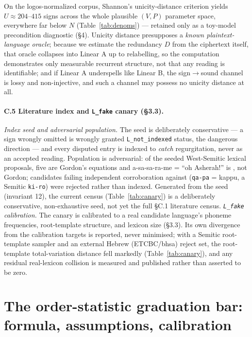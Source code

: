 On the logos-normalized corpus, Shannon's unicity-distance criterion
yields $U \approx 204$--$415$ signs across the whole plausible $(V, P)$
parameter space, everywhere far below $N$ (Table~\ref{tab:denoms}) ---
retained only as a toy-model precondition diagnostic (\S4). Unicity
distance presupposes a \emph{known plaintext-language oracle}; because we
estimate the redundancy $D$ from the ciphertext itself, that oracle
collapses into Linear A up to relabelling, so the computation
demonstrates only measurable recurrent structure, not that any reading is
identifiable; and if Linear A underspells like Linear B, the
sign$\rightarrow$sound channel is lossy and non-injective, and such a
channel may possess no unicity distance at all.

\paragraph{C.5 Literature index and \texttt{L\_fake} canary (\S3.3).} \emph{Index seed and adversarial population.}
The seed is deliberately conservative --- a sign wrongly omitted is wrongly
granted \texttt{L\_not\_indexed} status, the dangerous direction --- and
every disputed entry is indexed to \emph{catch} regurgitation, never as an
accepted reading. Population is adversarial: of the seeded West-Semitic
lexical proposals, five are Gordon's equations and a-sa-sa-ra-me = ``oh
Asherah!'' is \citet{best1981}, not Gordon; candidates failing independent
corroboration against \citet{rendsburg1996} (\texttt{qa-pa} = kappu, a
Semitic \texttt{ki-ro}) were rejected rather than indexed. Generated from the
seed (invariant 12), the current census (Table~\ref{tab:canary}) is a
deliberately conservative, non-exhaustive seed, not yet the full \S C.1
literature census.
\emph{\texttt{L\_fake} calibration.} The canary is calibrated to a real
candidate language's phoneme frequencies, root-template structure, and
lexicon size (\S3.3). Its own divergence from the calibration
targets is reported, never minimised; with a Semitic root-template sampler
and an external Hebrew (ETCBC/bhsa) reject set, the root-template
total-variation distance fell markedly (Table~\ref{tab:canary}), and any
residual real-lexicon collision is measured and published rather than
asserted to be zero.

\section{The order-statistic graduation bar: formula, assumptions,
calibration}

